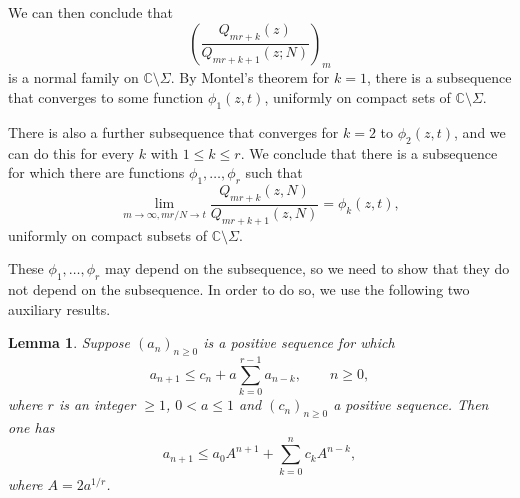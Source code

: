 \documentclass[12pt]{article}
\newtheorem{lemma}[theorem]{Lemma}
\numberwithin{equation}{section}
\begin{document}
We can then conclude that 
\[   \left( \frac{Q_{mr+k}(z)}{Q_{mr+k+1}(z;N)} \right)_m   \]
is a normal family on $\mathbb{C} \setminus \Sigma$. By Montel's theorem for $k=1$, there is a subsequence that converges to some function $\phi_1(z,t)$, uniformly
on compact sets of $\mathbb{C} \setminus \Sigma$.

 There is also a further subsequence that converges for $k=2$ to $\phi_2(z,t)$, and we can do this for every $k$ with $1 \leq k \leq r$. We conclude that there is a subsequence for which there are functions $\phi_1,\ldots,\phi_r$ such that
\begin{equation}  \label{eq:14}
   \lim_{m \to \infty, mr/N \to t} \frac{Q_{mr+k}(z,N)}{Q_{mr+k+1}(z,N)} = \phi_k(z,t), 
\end{equation}
uniformly on compact subsets of $\mathbb{C} \setminus \Sigma$. 

These $\phi_1,\ldots,\phi_r$ may depend on the subsequence, so we need to show that they do not depend on the subsequence. In order to do so, we use the following two auxiliary results. 

\begin{lemma}\label{lem:aux1}
Suppose $(a_n)_{n\geq 0}$ is a positive sequence for which
\begin{equation}  \label{ineq1}
    a_{n+1} \leq c_n + a \sum_{k=0}^{r-1} a_{n-k}, \qquad  n \geq 0, 
\end{equation}    
where $r$ is an integer $\geq 1$, $0 < a \leq 1$ and $(c_n)_{n \geq 0}$ a positive sequence. Then one has
\begin{equation}  \label{ineq2}
     a_{n+1} \leq   a_0 A^{n+1} + \sum_{k=0}^n c_k A^{n-k}, 
\end{equation}
where $A = 2 a^{1/r}$.
\end{lemma}
\end{document}
